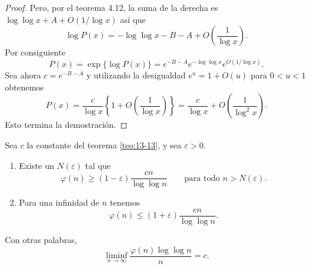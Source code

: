 \begin{proof}
        Pero, por el teorema 4.12, la suma de la derecha es $\log\log x+A+O(1/\log x)$
        así que
        \begin{equation*}
            \log P(x)=-\log\log x-B-A+O\left(\frac{1}{\log x}\right).
        \end{equation*}
        Por consiguiente
        \begin{equation*}
            P(x)=\exp\{\log P(x)\}=e^{-B-A}e^{-\log\log x}e^{O(1/\log x)}.
        \end{equation*}
        Sea ahora $c=e^{-B-A}$ y utilizando la desigualdad $e^u=1+O(u)$ para $0<u<1$ obtenemos
        \begin{equation*}
            P(x)=\frac{c}{\log x}\left\{1+O\left(\frac{1}{\log x}\right)\right\}=\frac{c}{\log x}+O\left(\frac{1}{\log^2x}\right).
        \end{equation*}
        Esto termina la demostración.
    \end{proof}

    \begin{teorema}\label{teo:13-14}
        Sea $c$ la constante del teorema \ref{teo:13-13}, y sea $\varepsilon>0$.
        \begin{enumerate}
            \item[(a)] Existe un $N(\varepsilon)$ tal que
            \begin{equation*}
                \varphi(n)\geq(1-\varepsilon)\frac{cn}{\log\log n}\qquad\text{para todo }n>N(\varepsilon).
            \end{equation*}
            \item[(b)] Para una infinidad de $n$ tenemos
            \begin{equation*}
                \varphi(n)\leq(1+\varepsilon)\frac{cn}{\log\log n}.
            \end{equation*}
        \end{enumerate}
        Con otras palabras,
        \begin{equation*}
            \liminf_{n\to\infty}\frac{\varphi(n)\log\log n}{n}=c.
        \end{equation*}
    \end{teorema}

